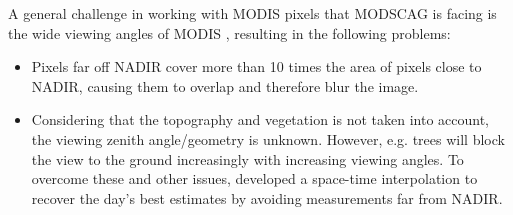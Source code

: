 \documentclass[a4paper,10pt]{article}
\begin{document}
A general challenge in working with \gls{MODIS} pixels that \gls{MODSCAG} is facing is the wide viewing angles of \gls{MODIS} \citep{Dozier2009, Dozier2008, Liu2008}, resulting in the following problems:
\begin{itemize}
 \item Pixels far off NADIR cover more than 10 times the area of pixels close to NADIR, causing them to overlap and therefore blur the image.
 \item Considering that the topography and vegetation is not taken into account, the viewing zenith angle/geometry is unknown. However, e.g. trees will block the view to the ground increasingly with increasing viewing angles.
To overcome these and other issues, \cite{Dozier2008} developed a space-time interpolation to recover the day's best estimates by avoiding measurements far from NADIR.
\end{itemize}














\nocite{Frew2004} 


\nocite{Samet1990} 
\nocite{Goodchild2002} 
\nocite{OpenGeospatialConsortium2017} 

\nocite{Adya2000} 
\nocite{Agrawal1993} 
\nocite{Baker2011} 
\nocite{Berenson1995}
\nocite{Bernstein1987} 
\nocite{Chang2008} 
\nocite{Cooper2008} 
\nocite{Das2010} 
\nocite{Das2011} 
\nocite{Das2013} 
\nocite{Decandia2007}
\nocite{DivyakantAgrawal2012}
\nocite{Elhardt1984} 
\nocite{Elmore2011} 
\nocite{Gray2006} 
\nocite{Hellerstein2007} 
\nocite{Kung1981} 
\nocite{Larson2011}
\nocite{Weikum2002} 
\end{document}
